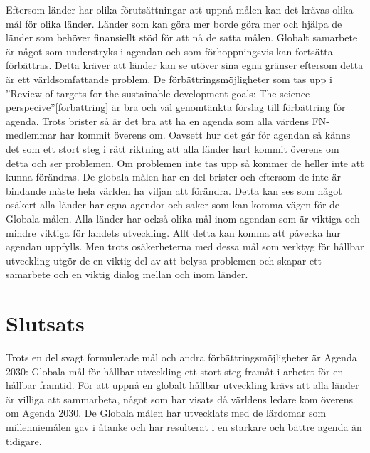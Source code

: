 \documentclass{report}
\begin{document}
Eftersom länder har olika förutsättningar att uppnå målen kan det krävas olika mål för olika länder. Länder som kan göra mer borde göra mer och hjälpa de länder som behöver finansiellt stöd för att nå de satta målen. Globalt samarbete är något som understryks i agendan och som förhoppningsvis kan fortsätta förbättras. Detta kräver att länder kan se utöver sina egna gränser eftersom detta är ett världsomfattande problem.
De förbättringsmöjligheter som tas upp i ”Review of targets for the sustainable development goals: The science perspecive”\ref{forbattring} är bra och väl genomtänkta förslag till förbättring för agenda. Trots brister så är det bra att ha en agenda som alla värdens FN-medlemmar har kommit överens om. Oavsett hur det går för agendan så känns det som ett stort steg i rätt riktning att alla länder hart kommit överens om detta och ser problemen. Om problemen inte tas upp så kommer de heller inte att kunna förändras. De globala målen har en del brister och eftersom de inte är bindande måste hela världen ha viljan att förändra. Detta kan ses som något osäkert alla länder har egna agendor och saker som kan komma vägen för de Globala målen. Alla länder har också olika mål inom agendan som är viktiga och mindre viktiga för landets utveckling. Allt detta kan komma att påverka hur agendan uppfylls. Men trots osäkerheterna med dessa mål som verktyg för hållbar utveckling utgör de en viktig del av att belysa problemen och skapar ett samarbete och en viktig dialog mellan och inom länder. \\



\newpage
\section{Slutsats}
Trots en del svagt formulerade mål och andra förbättringsmöjligheter är Agenda 2030: Globala mål för hållbar utveckling ett stort steg framåt i arbetet för en hållbar framtid. För att uppnå en globalt hållbar utveckling krävs att alla länder är villiga att sammarbeta, något som har visats då världens ledare kom överens om Agenda 2030. De Globala målen har utvecklats med de lärdomar som millenniemålen gav i åtanke och har resulterat i en starkare och bättre agenda än tidigare.

 
\end{document}
